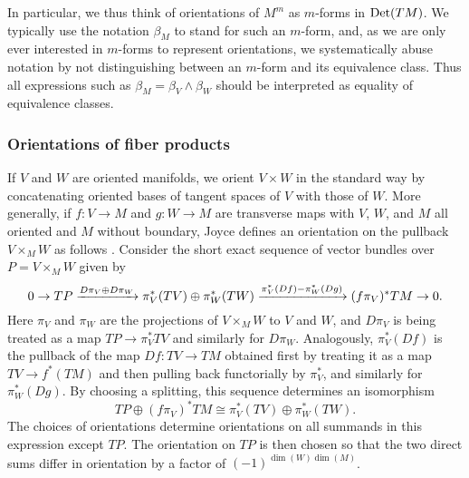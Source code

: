 In particular, we thus think of orientations of $M^m$ as $m$-forms in ${\rm Det}(TM)$.
We typically use the notation $\beta_M$ to stand for such an $m$-form, and, as we are only ever interested in $m$-forms to represent orientations, we systematically abuse notation by not distinguishing between an $m$-form and its equivalence class.
Thus all expressions such as $\beta_M=\beta_V\wedge \beta_W$ should be interpreted as equality of equivalence classes.

\subsubsection{Orientations of fiber products}

If $V$ and $W$ are oriented manifolds, we orient $V\times W$ in the standard way by concatenating oriented bases of tangent spaces of $V$ with those of $W$.
More generally, if $f \colon V\to M$ and $g \colon W\to M$ are transverse maps with $V$, $W$, and $M$ all oriented and $M$ without boundary, Joyce defines an orientation on the pullback $V\times_M W$ as follows \cite[Convention 7.2b]{Joy12}.
Consider the short exact sequence of vector bundles over $P=V\times_MW$ given by
\begin{equation}\label{E: fiber orientation}
	0\to TP\xrightarrow{D\pi_V\oplus D\pi_W} \pi_V^*(TV)\oplus \pi_W^*(TW)\xrightarrow{\pi_V^*(Df)-\pi_W^*(Dg)} (f\pi_V)^*TM\to 0.
\end{equation}
Here $\pi_V$ and $\pi_W$ are the projections of $V\times_MW$ to $V$ and $W$, and $D\pi_V$ is being treated as a map $TP\to \pi_V^*TV$ and similarly for $D\pi_W$.
Analogously, $\pi_V^*(Df)$ is the pullback of the map $Df \colon TV\to TM$ obtained first by treating it as a map $TV\to f^*(TM)$ and then pulling back functorially by $\pi_V^*$, and similarly for $\pi_W^*(Dg)$.
By choosing a splitting, this sequence determines an isomorphism
\[
TP\oplus (f\pi_V)^*TM\cong\pi_V^*(TV)\oplus \pi_W^*(TW).
\]
The choices of orientations determine orientations on all summands in this expression except $TP$.
The orientation on $TP$ is then chosen so that the two direct sums differ in orientation by a factor of $(-1)^{\dim(W)\dim(M)}$.

